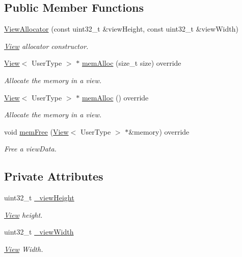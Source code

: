 \subsection*{Public Member Functions}
\begin{DoxyCompactItemize}
\item 
\hyperlink{classfi_1_1ViewAllocator_a17e386590e9c9146b804a82cd878dfe9}{View\+Allocator} (const uint32\+\_\+t \&view\+Height, const uint32\+\_\+t \&view\+Width)
\begin{DoxyCompactList}\small\item\em \hyperlink{classfi_1_1View}{View} allocator constructor. \end{DoxyCompactList}\item 
\hyperlink{classfi_1_1View}{View}$<$ User\+Type $>$ $\ast$ \hyperlink{classfi_1_1ViewAllocator_ac0744636f7f0b90054c13adf49af279b}{mem\+Alloc} (size\+\_\+t size) override
\begin{DoxyCompactList}\small\item\em Allocate the memory in a view. \end{DoxyCompactList}\item 
\hyperlink{classfi_1_1View}{View}$<$ User\+Type $>$ $\ast$ \hyperlink{classfi_1_1ViewAllocator_a6cc2583a683f09e59f35d7180fe0c188}{mem\+Alloc} () override
\begin{DoxyCompactList}\small\item\em Allocate the memory in a view. \end{DoxyCompactList}\item 
void \hyperlink{classfi_1_1ViewAllocator_a63bd33e7f615ea7dcc138e988f4a09e9}{mem\+Free} (\hyperlink{classfi_1_1View}{View}$<$ User\+Type $>$ $\ast$\&memory) override
\begin{DoxyCompactList}\small\item\em Free a view\+Data. \end{DoxyCompactList}\end{DoxyCompactItemize}
\subsection*{Private Attributes}
\begin{DoxyCompactItemize}
\item 
uint32\+\_\+t \hyperlink{classfi_1_1ViewAllocator_a881d0f5707b2eaa7734be0edf66267bc}{\+\_\+view\+Height}
\begin{DoxyCompactList}\small\item\em \hyperlink{classfi_1_1View}{View} height. \end{DoxyCompactList}\item 
uint32\+\_\+t \hyperlink{classfi_1_1ViewAllocator_ace1013f391dd45b3ed672ebf2be47bff}{\+\_\+view\+Width}
\begin{DoxyCompactList}\small\item\em \hyperlink{classfi_1_1View}{View} Width. \end{DoxyCompactList}\end{DoxyCompactItemize}



